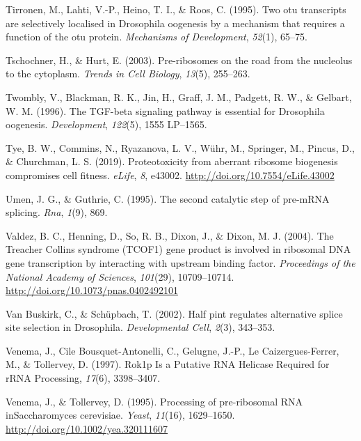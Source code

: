\documentclass[12pt,twoside]{reedthesis}
\newlength{\cslhangindent}
\newenvironment{cslreferences}%
  {\setlength{\parindent}{0pt}%
  \everypar{\setlength{\hangindent}{\cslhangindent}}\ignorespaces}%
  {\par}
\begin{document}
\begin{cslreferences}
\leavevmode\hypertarget{ref-Tirronen1995}{}%
Tirronen, M., Lahti, V.-P., Heino, T. I., \& Roos, C. (1995). Two otu transcripts are selectively localised in Drosophila oogenesis by a mechanism that requires a function of the otu protein. \emph{Mechanisms of Development}, \emph{52}(1), 65--75.

\leavevmode\hypertarget{ref-Tschochner2003a}{}%
Tschochner, H., \& Hurt, E. (2003). Pre-ribosomes on the road from the nucleolus to the cytoplasm. \emph{Trends in Cell Biology}, \emph{13}(5), 255--263.

\leavevmode\hypertarget{ref-Twombly1996d}{}%
Twombly, V., Blackman, R. K., Jin, H., Graff, J. M., Padgett, R. W., \& Gelbart, W. M. (1996). The TGF-beta signaling pathway is essential for Drosophila oogenesis. \emph{Development}, \emph{122}(5), 1555 LP--1565.

\leavevmode\hypertarget{ref-tyeProteotoxicityAberrantRibosome2019}{}%
Tye, B. W., Commins, N., Ryazanova, L. V., Wühr, M., Springer, M., Pincus, D., \& Churchman, L. S. (2019). Proteotoxicity from aberrant ribosome biogenesis compromises cell fitness. \emph{eLife}, \emph{8}, e43002. \url{http://doi.org/10.7554/eLife.43002}

\leavevmode\hypertarget{ref-Umen1995}{}%
Umen, J. G., \& Guthrie, C. (1995). The second catalytic step of pre-mRNA splicing. \emph{Rna}, \emph{1}(9), 869.

\leavevmode\hypertarget{ref-valdezTreacherCollinsSyndrome2004}{}%
Valdez, B. C., Henning, D., So, R. B., Dixon, J., \& Dixon, M. J. (2004). The Treacher Collins syndrome (TCOF1) gene product is involved in ribosomal DNA gene transcription by interacting with upstream binding factor. \emph{Proceedings of the National Academy of Sciences}, \emph{101}(29), 10709--10714. \url{http://doi.org/10.1073/pnas.0402492101}

\leavevmode\hypertarget{ref-VanBuskirk2002}{}%
Van Buskirk, C., \& Schüpbach, T. (2002). Half pint regulates alternative splice site selection in Drosophila. \emph{Developmental Cell}, \emph{2}(3), 343--353.

\leavevmode\hypertarget{ref-Venema1997}{}%
Venema, J., Cile Bousquet-Antonelli, C., Gelugne, J.-P., Le Caizergues-Ferrer, M., \& Tollervey, D. (1997). Rok1p Is a Putative RNA Helicase Required for rRNA Processing, \emph{17}(6), 3398--3407.

\leavevmode\hypertarget{ref-venemaProcessingPreribosomalRNA1995}{}%
Venema, J., \& Tollervey, D. (1995). Processing of pre-ribosomal RNA inSaccharomyces cerevisiae. \emph{Yeast}, \emph{11}(16), 1629--1650. \url{http://doi.org/10.1002/yea.320111607}


\end{cslreferences}
\end{document}
